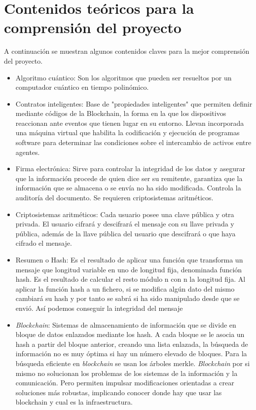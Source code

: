 \section{Contenidos teóricos para la comprensión del proyecto}

A continuación se muestran algunos contenidos claves para la mejor comprensión del proyecto.

\begin{itemize}
	\item Algoritmo cuántico: Son los algoritmos que pueden ser resueltos por un computador cuántico en tiempo polinómico.

	\item Contratos inteligentes: Base de "propiedades inteligentes" que permiten definir mediante códigos de la Blockchain, la forma en la que los dispositivos reaccionan ante eventos que tienen lugar en su entorno. Llevan incorporada una máquina virtual que habilita la codificación y ejecución de programas software para determinar las condiciones sobre el intercambio de activos entre agentes.


 	\item Firma electrónica: Sirve para controlar la integridad de los datos y asegurar que la información procede de quien dice ser su remitente, garantiza que la información que se almacena o se envía no ha sido modificada. Controla la auditoría del documento. Se requieren criptosistemas aritméticos.


	\item Criptosistemas aritméticos: Cada usuario posee una clave pública y otra privada. El usuario cifrará y descifrará el mensaje con su llave privada y pública, además de la llave pública del usuario que descifrará o que haya cifrado el mensaje.


	\item Resumen o Hash: Es el resultado de aplicar una función que transforma un mensaje que longitud variable en uno de longitud fija, denominada función hash. Es el resultado de calcular el resto módulo n con n la longitud fija. Al aplicar la función hash a un fichero, si se modifica algún dato del mismo cambiará su hash y por tanto se sabrá si ha sido manipulado desde que se envió. Así podemos conseguir la integridad del mensaje


	\item \textit{Blockchain}: Sistemas de almacenamiento de información que se divide en bloque de datos enlazados mediante los hash. A cada bloque se le asocia un hash a partir del bloque anterior, creando una lista enlazada, la búsqueda de información no es muy óptima si hay un número elevado de bloques. Para la búsqueda eficiente en \textit{blockchain} se usan los árboles merkle.
\textit{Blockchain} por si mismo no solucionan los problemas de los sistemas de la información y la comunicación. Pero permiten impulsar modificaciones orientadas a crear soluciones más robustas, implicando conocer donde hay que usar las blockchain y cual es la infraestructura.



\end{itemize}
